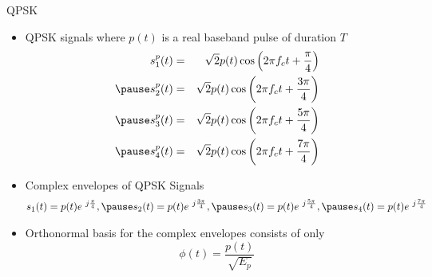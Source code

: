 \documentclass[t]{beamer}
\begin{document}
\begin{frame}{QPSK}
  \footnotesize
  \begin{itemize}
    \item \pause QPSK signals where $p(t)$ is a real baseband pulse of duration $T$
    \begin{eqnarray*}
      s_1^p(t) & = & \sqrt{2}p(t)\cos \left( 2\pi f_c t + \frac{\pi}{4}\right) \\ \pause
      s_2^p(t) & = & \sqrt{2}p(t)\cos \left( 2\pi f_c t + \frac{3\pi}{4}\right) \\ \pause
      s_3^p(t) & = & \sqrt{2}p(t)\cos \left( 2\pi f_c t + \frac{5\pi}{4}\right) \\ \pause
      s_4^p(t) & = & \sqrt{2}p(t)\cos \left( 2\pi f_c t + \frac{7\pi}{4}\right)
    \end{eqnarray*}
    \item \pause Complex envelopes of QPSK Signals
      \begin{eqnarray*}
        s_1(t) = p(t)e^{\ j\frac{\pi}{4}}, \pause
        s_2(t) = p(t)e^{\ j\frac{3\pi}{4}}, \pause
        s_3(t) = p(t)e^{\ j\frac{5\pi}{4}}, \pause
        s_4(t) = p(t)e^{\ j\frac{7\pi}{4}}
      \end{eqnarray*}
    \item \pause Orthonormal basis for the complex envelopes consists of \pause only
      \begin{equation*}
        \phi(t) = \frac{p(t)}{\sqrt{E_p}}
      \end{equation*}
  \end{itemize}
  \normalsize
\end{frame}
\end{document}
